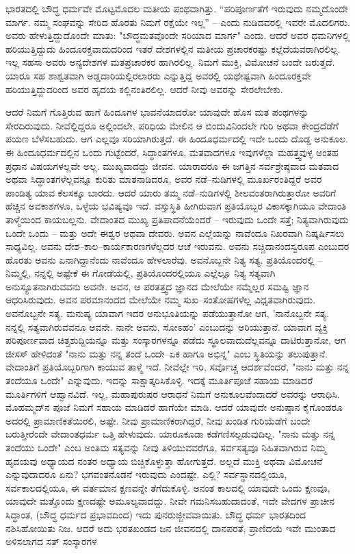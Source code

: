 ಭಾರತದಲ್ಲಿ ಬೌದ್ಧ ಧರ್ಮವೇ ಮೊಟ್ಟಮೊದಲ ಮತೀಯ ಪಂಥವಾಗಿತ್ತು. “ಪರಿಪೂರ್ಣತೆಗೆ ಇರುವುದು ನಮ್ಮದೊಂದೇ ಮಾರ್ಗ. ನಮ್ಮ ಸಂಘವನ್ನು ಸೇರಿದ ಹೊರತು ನಿಮಗೆ ರಕ್ಷೆಯೇ ಇಲ್ಲ” – ಎಂದು ನುಡಿದವರಲ್ಲಿ ಇವರೇ ಮೊದಲಿಗರು. ಅವರು ಹೇಳುತ್ತಿದ್ದುದೊಂದೇ ಮಾತು: "ಬೌದ್ಧಮತವೊಂದೇ ಸರಿಯಾದ ಮಾರ್ಗ" ಎಂದು. ಆದರೆ ಅವರ ಧಮನಿಗಳಲ್ಲಿ ಹರಿಯುತ್ತಿದ್ದುದು ಹಿಂದೂರಕ್ತವಾದುದರಿಂದ ಇತರೆ ದೇಶಗಳಲ್ಲಿನ ಮತೀಯ ಪ್ರಚಾರಕರಷ್ಟು ಕಲ್ಲೆದೆಯವರಾಗಿರಲಿಲ್ಲ. ಇಲ್ಲ ಸಹಸಾ ಅವರು ಅನ್ಯದೇಶಗಳ ಮತಪ್ರಚಾರಕರ ಹಾಗಿರಲಿಲ್ಲ. ನಿಮಗೆ ಮುಕ್ತಿ, ವಿಮೋಚನೆ ಬಂದೇ ಬರುತ್ತದೆ. ಯಾರೂ ಸಹ ಶಾಶ್ವತವಾಗಿ ಅಡ್ಡದಾರಿಯಲ್ಲಿರಲಾರರು ಎನ್ನುತ್ತಿದ್ದ ಅವರಲ್ಲಿ ಯಥೇಷ್ಟವಾಗಿ ಹಿಂದೂರಕ್ತವೇ ಹರಿಯುತ್ತಿದ್ದುದರಿಂದ ಅವರ ಹೃದಯ ಕಲ್ಲಿನಂತಿರಲಿಲ್ಲ. ಆದರೆ ನೀವು ಅವರನ್ನು ಸೇರಲೇಬೇಕು.

ಆದರೆ ನಿಮಗೆ ಗೊತ್ತಿರುವ ಹಾಗೆ ಹಿಂದೂಗಳ ಭಾವನೆಯಾದರೋ ಯಾವುದೇ ಹೊಸ ಮತ ಪಂಥಗಳನ್ನು ಸೇರದಿರುವುದು. ನೀವೆಲ್ಲಿದ್ದರೂ ಅಲ್ಲಿಂದಲೇ, ಪರಿಧಿಯ ಮೇಲಿನ ಆ ಬಿಂದುವಿನಿಂದಲೇ ಗುರಿ ಅಥವಾ ಕೇಂದ್ರದೆಡೆಗೆ ಪಯಣ ಬೆಳೆಸಬಹುದು. ಆಗ ಎಲ್ಲವೂ ಸರಿಯಾಗಿರುತ್ತದೆ. ಈ ಹಿಂದೂಧರ್ಮದಲ್ಲಿ ಇದೇ ಒಂದು ದೊಡ್ಡ ಅನುಕೂಲ. ಈ ಹಿಂದೂಧರ್ಮದಲ್ಲಿನ ಒಂದು ಗುಟ್ಟೆಂದರೆ, ಸಿದ್ಧಾಂತಗಳೂ, ಮತವಾದಗಳೂ ಇವುಗಳೆಲ್ಲಾ ಮಹತ್ತ್ವವುಳ್ಳ ಅಂತಹ ಪ್ರಧಾನ ವಿಷಯಗಳಲ್ಲವೇ ಅಲ್ಲ. ಮುಖ್ಯವಾದದ್ದು ಜೀವನ. ಯಾರಾದರೂ ಈ ಜಗತ್ತಿನ ಸರ್ವಶ್ರೇಷ್ಠವಾದ ಮತವಾದ ಅಥವಾ ಸಿದ್ಧಾಂತಗಳೆಲ್ಲವನ್ನೂ ಕುರಿತು ಮಾತನಾಡಿದರೂ, ಅವರ ನಡೆ–ನುಡಿಗಳಲ್ಲಿ ಮೂರ್ಖರಂತಿದ್ದರೆ ಅವರ ಪಾಂಡಿತ್ಯ ಯಾವ ಕೆಲಸಕ್ಕೂ ಬಾರದು. ಆದರೆ ಯಾರು ತಮ್ಮ ನಡೆ–ನುಡಿಗಳಲ್ಲಿ ಶೀಲವಂತರಾಗಿರುತ್ತಾರೋ ಅವರಿಗೆ ಹೆಚ್ಚಿನ ಅವಕಾಶಗಳೂ, ಒಳ್ಳೆಯ ಭವಿಷ್ಯವೂ ಇದೆ. ವಸ್ತುಸ್ಥಿತಿ ಹೀಗಿರುವಾಗ ಪ್ರತಿಯೊಬ್ಬರ ವಿಕಾಸಕ್ಕಾಗಿಯೂ ವೇದಾಂತಿ ತಾಳ್ಮೆಯಿಂದ ಕಾಯಬಲ್ಲನು. ವೇದಾಂತದ ಮುಖ್ಯ ಪ್ರತಿಪಾದನೆಯೆಂದರೆ – ಇರುವುದು ಒಂದೇ ಸತ್ತೆ; ನಿತ್ಯವಾಗಿರುವುದು ಒಂದೇ ಒಂದು – ಮತ್ತು ಅದೇ ಈಶ್ವರ ಅಥವಾ ದೇವರು. ಅವನ ಎಲ್ಲೆಯನ್ನು ನಾವೆಂದೂ ನಿಖರವಾಗಿ ನಿಷ್ಕರ್ಷಿಸಲು ಸಾಧ್ಯವಿಲ್ಲ. ಅವನು ದೇಶ–ಕಾಲ–ಕಾರ್ಯಕಾರಣಗಳೆಲ್ಲದರ ಆಚೆ ಇರುವನು. ಅವನು ಸಚ್ಚಿದಾನಂದಸ್ವರೂಪ ಎಂಬುದರ ಹೊರತು ಅವನು ಏನಾಗಿದ್ದಾನೆಂದು ನಾವೆಂದೂ ಹೇಳಲಾರೆವು. ಅವನೊಬ್ಬನೇ ನಿತ್ಯ ಸತ್ಯ. ಪ್ರತಿಯೊಂದರಲ್ಲಿ – ನಿಮ್ಮಲ್ಲಿ, ನನ್ನಲ್ಲಿ ಅಷ್ಟೇಕೆ ಈ ಗೋಡೆಯಲ್ಲಿ, ಪ್ರತಿಯೊಂದರಲ್ಲಿಯೂ ಎಲ್ಲೆಲ್ಲೂ ನಿತ್ಯ ಸತ್ಯವಾಗಿ ಅನುಸ್ಯೂತನಾಗಿರುವವನು ಅವನೇ. ಅವನ, ಆ ಪರತತ್ತ್ವದ ಜ್ಞಾನದ ಮೇಲೆಯೇ ನಮ್ಮೆಲ್ಲರ ಸಮಷ್ಟಿ ಜ್ಞಾನ ಆಧರಿಸಿರುವುದು. ಅವನ ಪರಮಾನಂದದ ಮೇಲೆಯೇ ನಮ್ಮ ಸುಖ–ಸಂತೋಷಗಳೆಲ್ಲ ವಿಧೃತವಾಗಿರುವುದು. ಅವನೊಬ್ಬನೇ ಸತ್ಯ. ಮನುಷ್ಯ ಯಾವಾಗ ಇದರ ಅನುಭೂತಿಯನ್ನು ಪಡೆಯುತ್ತಾನೋ ಆಗ, 'ನಾನೊಬ್ಬನೇ ಸತ್ಯ. ನನ್ನಲ್ಲಿ ಸತ್ಯವಾಗಿರುವವನೂ ಅವನೇ. ನಾನೇ ಅವನು, ಸೋಽಹಂ' ಎಂಬುದನ್ನು ಅರಿಯುತ್ತಾನೆ. ಯಾವಾಗ ವ್ಯಕ್ತಿ ಪರಿಪೂರ್ಣವಾದ ಚಿತ್ತಶುದ್ದಿಯನ್ನೂ ಮತ್ತು ಸಂಸ್ಕಾರಗಳನ್ನೂ ಪಡೆದು ಸ್ಥೂಲವಾದುದೆಲ್ಲವನ್ನೂ ದಾಟಿರುತ್ತಾನೋ, ಆಗ ಜೀಸಸ್ ಹೇಳಿದಂತೆ "ನಾನು ಮತ್ತು ನನ್ನ ತಂದೆ ಒಂದೇ–ಏಕ ಹಾಗೂ ಅಭಿನ್ನ" ಎಂಬ ಸ್ಥಿತಿಯನ್ನು ತಲುಪುತ್ತಾನೆ. ವೇದಾಂತಿಗೆ ಪ್ರತಿಯೊಬ್ಬರಿಗಾಗಿ ಕಾಯುವ ತಾಳ್ಮೆ ಇದೆ. ನೀವೆಲ್ಲೇ ಇರಿ, ಸರ್ವೊಚ್ಚ ಆದರ್ಶವೆಂದರೆ, "ನಾನು ಮತ್ತು ನನ್ನ ತಂದೆಯೂ ಒಂದೇ" ಎನ್ನುವುದು. ಇದನ್ನು ಸಾಕ್ಷಾತ್ಕರಿಸಿಕೊಳ್ಳಿ. ಇದಕ್ಕೆ ಮೂರ್ತಿಪೂಜೆ ಸಹಾಯ ಮಾಡಿದರೆ ಮೂರ್ತಿಗಳಿಗೆ ಆಹ್ವಾನವಿದೆ. ಇಲ್ಲ, ಮಹಾಪುರುಷರ ಆರಾಧನೆ ನಿಮಗೆ ಅನುಕೂಲವೆಂದಾದರೆ ಅವರನ್ನು ಆರಾಧಿಸಿ. ಮೊಹಮ್ಮದ್‌ನ ಪೂಜೆ ನಿಮಗೆ ಸಹಾಯ ಮಾಡಿದರೆ ಹಾಗೆಯೇ ಮಾಡಿ. ಆದರೆ ಯಾವುದೇ ಅನುಷ್ಠಾನ ಕೈಗೊಂಡರೂ ಅದರಲ್ಲಿ ಪ್ರಾಮಾಣಿಕತೆಯಿರಲಿ, ಅಷ್ಟೇ. ನೀವು ಪ್ರಾಮಾಣಿಕರಾಗಿದ್ದರೆ, ನೀವು ಖಂಡಿತ ಗುರಿಯೆಡೆಗೆ ಬಂದೇ ಬರುತ್ತೀರೆಂದೇ ವೇದಾಂತಧರ್ಮ ಒತ್ತಿ ಹೇಳುವುದು. ಯಾರೂಕೂಡಾ ಕಡೆಗಣಿಸಲ್ಪಡುವುದಿಲ್ಲ. "ನಾನು ಮತ್ತು ನನ್ನ ತಂದೆಯು ಒಂದೇ" ಎಂಬ ಅಂತಿಮ ಸತ್ಯವನ್ನು ನೀವು ತಿಳಿಯುವವರೆಗೂ, ಸರ್ವಸತ್ಯವೂ ನಿಹಿತವಾಗಿರುವ ನಿಮ್ಮ ಹೃದಯವು ಅಧ್ಯಾಯದ ನಂತರ ಅಧ್ಯಾಯ ಬಿಚ್ಚಿಕೊಳ್ಳುತ್ತಾ ಹೋಗುತ್ತದೆ. ಅಲ್ಲದೆ ಮುಕ್ತಿ ಅಥವಾ ವಿಮೋಚನೆ ಎನ್ನುವುದಾದರೂ ಏನು? ಭಗವಂತನೊಡನೆ ಇರುವುದು ಎಂದಷ್ಟೇ. ಎಲ್ಲಿ? ಸರ್ವಸ್ಥಾನದಲ್ಲಿಯೂ, ಸರ್ವಕಾಲದಲ್ಲಿಯೂ, ಈ ವರ್ತಮಾನ ಕ್ಷಣವನ್ನೇ ತೆಗೆದುಕೊಳ್ಳಿ. ಅನಂತ ಕಾಲದಲ್ಲಿ ಯಾವುದೇ ಒಂದು ಕ್ಷಣವೂ, ಯಾವುದೇ ಮತ್ತೊಂದು ಕ್ಷಣದಷ್ಟೇ ಅಮೂಲ್ಯವಾದದ್ದು. ನೀವೇ ಗಮನಿಸಬಹುದಾದಂತೆ, ಇದೇ ವೇದಗಳ ಪ್ರಾಚೀನ ಸಿದ್ಧಾಂತ, (ಬೌದ್ಧ ಧರ್ಮದ ಪ್ರಭಾವದಿಂದ) ಇದು ಪುನರುಜ್ಜೀವವಾಯಿತು. ಬೌದ್ಧ ಧರ್ಮ ಭಾರತದಿಂದ ನಶಿಸಿಹೋಯಿತು ನಿಜ. ಆದರೆ ಅದು ಭರತಖಂಡದ ಜನ ಜೀವನದಲ್ಲಿ ದಾನಪರತೆ, ಪ್ರಾಣಿದಯೆ ಇವೇ ಮುಂತಾದ ಅಳಿಸಲಾಗದ ಸತ್ ಸಂಸ್ಕಾರಗಳ 